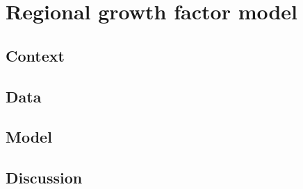 \section{Regional growth factor model}%
\label{sec:regional_growth_factor_model}

\subsection{Context}
\subsection{Data}
\subsection{Model}
\subsection{Discussion}